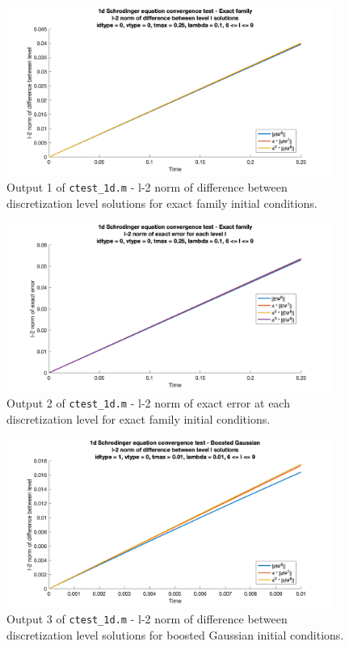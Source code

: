 \documentclass[10pt]{article}
\def\code#1{\texttt{#1}} %
\begin{document}
\begin{figure}[H]
\centering
\includegraphics[width=0.95\textwidth]{problem1/ctest_1d-1.png}
\caption{Output 1 of \code{ctest\_1d.m} - 
l-2 norm of difference between discretization level solutions for exact family initial conditions.}
\end{figure}
\begin{figure}[H]
\centering
\includegraphics[width=0.95\textwidth]{problem1/ctest_1d-2.png}
\caption{Output 2 of \code{ctest\_1d.m} - 
l-2 norm of exact error at each discretization level for exact family initial conditions.}
\end{figure}
\begin{figure}[H]
\centering
\includegraphics[width=0.95\textwidth]{problem1/ctest_1d-3.png}
\caption{Output 3 of \code{ctest\_1d.m} - 
l-2 norm of difference between discretization level solutions for boosted Gaussian initial 
conditions.}
\end{figure}
\end{document}
